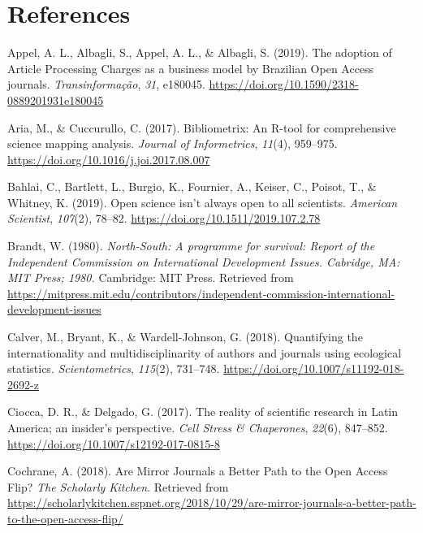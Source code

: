 \documentclass[
  english,
  man]{apa6}
\begin{document}
\newpage

\hypertarget{references}{%
\section{References}\label{references}}

\begingroup
\setlength{\parindent}{-0.5in}
\setlength{\leftskip}{0.5in}

\hypertarget{refs}{}
\leavevmode\hypertarget{ref-appel_adoption_2019}{}%
Appel, A. L., Albagli, S., Appel, A. L., \& Albagli, S. (2019). The adoption of Article Processing Charges as a business model by Brazilian Open Access journals. \emph{Transinformação}, \emph{31}, e180045. \url{https://doi.org/10.1590/2318-0889201931e180045}

\leavevmode\hypertarget{ref-aria_bibliometrix_2017}{}%
Aria, M., \& Cuccurullo, C. (2017). Bibliometrix: An R-tool for comprehensive science mapping analysis. \emph{Journal of Informetrics}, \emph{11}(4), 959--975. \url{https://doi.org/10.1016/j.joi.2017.08.007}

\leavevmode\hypertarget{ref-bahlai_open_2019}{}%
Bahlai, C., Bartlett, L., Burgio, K., Fournier, A., Keiser, C., Poisot, T., \& Whitney, K. (2019). Open science isn't always open to all scientists. \emph{American Scientist}, \emph{107}(2), 78--82. \url{https://doi.org/10.1511/2019.107.2.78}

\leavevmode\hypertarget{ref-brandt_north-south_1980}{}%
Brandt, W. (1980). \emph{North-South: A programme for survival: Report of the Independent Commission on International Development Issues. Cabridge, MA: MIT Press; 1980.} Cambridge: MIT Press. Retrieved from \url{https://mitpress.mit.edu/contributors/independent-commission-international-development-issues}

\leavevmode\hypertarget{ref-calver_quantifying_2018}{}%
Calver, M., Bryant, K., \& Wardell-Johnson, G. (2018). Quantifying the internationality and multidisciplinarity of authors and journals using ecological statistics. \emph{Scientometrics}, \emph{115}(2), 731--748. \url{https://doi.org/10.1007/s11192-018-2692-z}

\leavevmode\hypertarget{ref-ciocca_reality_2017}{}%
Ciocca, D. R., \& Delgado, G. (2017). The reality of scientific research in Latin America; an insider's perspective. \emph{Cell Stress \& Chaperones}, \emph{22}(6), 847--852. \url{https://doi.org/10.1007/s12192-017-0815-8}

\leavevmode\hypertarget{ref-cochrane_are_2018}{}%
Cochrane, A. (2018). Are Mirror Journals a Better Path to the Open Access Flip? \emph{The Scholarly Kitchen}. Retrieved from \url{https://scholarlykitchen.sspnet.org/2018/10/29/are-mirror-journals-a-better-path-to-the-open-access-flip/}
\end{document}
